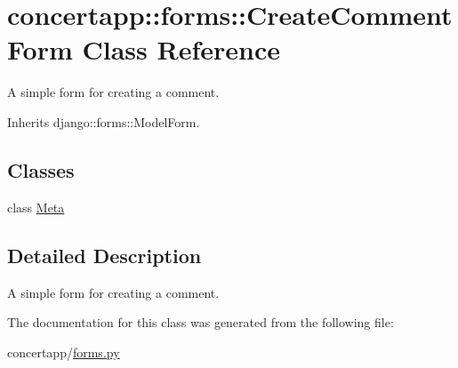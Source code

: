 \hypertarget{classconcertapp_1_1forms_1_1_create_comment_form}{
\section{concertapp::forms::CreateCommentForm Class Reference}
\label{classconcertapp_1_1forms_1_1_create_comment_form}
}


A simple form for creating a comment.  




Inherits django::forms::ModelForm.

\subsection*{Classes}
\begin{DoxyCompactItemize}
\item 
class \hyperlink{classconcertapp_1_1forms_1_1_create_comment_form_1_1_meta}{Meta}
\end{DoxyCompactItemize}


\subsection{Detailed Description}
A simple form for creating a comment. 

The documentation for this class was generated from the following file:\begin{DoxyCompactItemize}
\item 
concertapp/\hyperlink{forms_8py}{forms.py}\end{DoxyCompactItemize}
